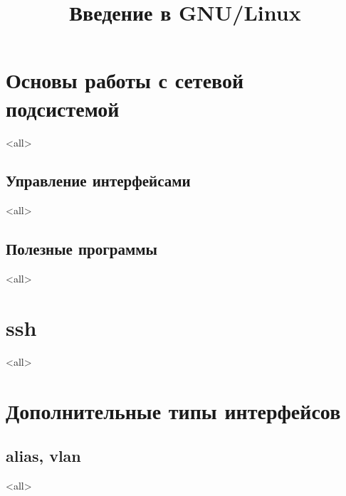 

\title{Введение в GNU/Linux}








\begin{frame}
	\frametitle{}
	\titlepage
	\vspace{-0.5cm}
	\begin{center}
	\end{center}
\end{frame}



\section{Основы работы с сетевой подсистемой}

\mode<all>{}

\subsection{Управление интерфейсами}
\mode<all>{}

\subsection{Полезные программы}
\mode<all>{}

\section{ssh}
\mode<all>{}


\section{Дополнительные типы интерфейсов}

\subsection{alias, vlan}
\mode<all>{}
